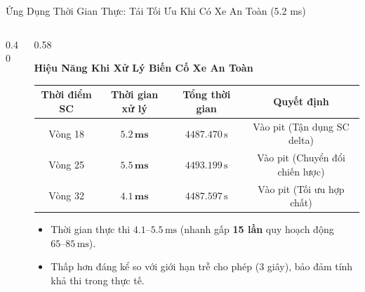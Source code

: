 \documentclass[aspectratio=169, 10pt]{beamer}
\begin{document}
\begin{frame}{Ứng Dụng Thời Gian Thực: Tái Tối Ưu Khi Có Xe An Toàn (5.2 ms)}
  \begin{columns}[T]
    \begin{column}{0.40\textwidth}
      \vspace{0.15cm}
    \end{column}

    \begin{column}{0.58\textwidth}
      \begin{alertblock}{\textbf{Hiệu Năng Khi Xử Lý Biến Cố Xe An Toàn}}
        \scriptsize
        \renewcommand{\arraystretch}{1.2}
        \begin{tabularx}{\linewidth}{cccc}
          \toprule
          \textbf{Thời điểm SC} & \textbf{Thời gian xử lý} & \textbf{Tổng thời gian} & \textbf{Quyết định} \\
          \midrule
          Vòng 18 & $\mathbf{5.2\,\text{ms}}$ & $4487.470\,\text{s}$ & Vào pit (Tận dụng SC delta) \\
          Vòng 25 & $\mathbf{5.5\,\text{ms}}$ & $4493.199\,\text{s}$ & Vào pit (Chuyển đổi chiến lược) \\
          Vòng 32 & $\mathbf{4.1\,\text{ms}}$ & $4487.597\,\text{s}$ & Vào pit (Tối ưu hợp chất) \\
          \bottomrule
        \end{tabularx}
        \vspace{0.08cm}
        \begin{itemize}
          \item Thời gian thực thi \textbf{$4.1\text{--}5.5\,\text{ms}$} (nhanh gấp \textbf{15 lần} quy hoạch động $65\text{--}85\,\text{ms}$).
          \item Thấp hơn đáng kể so với giới hạn trễ cho phép (3 giây), bảo đảm tính khả thi trong thực tế.
        \end{itemize}
      \end{alertblock}
    \end{column}
  \end{columns}
\end{frame}
\end{document}
